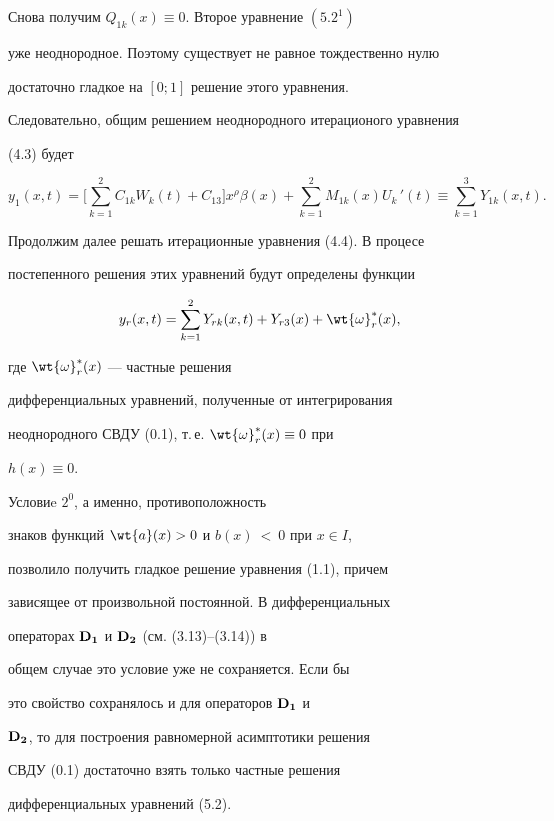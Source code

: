 Снова получим $Q_{1k} (x) \equiv 0$. Второе уравнение $(5.2^1)$


уже неоднородное. Поэтому существует не равное тождественно нулю


достаточно гладкое на $[0; 1]$ решение этого уравнения.


Следовательно, общим решением неоднородного итерационого уравнения


(4.3) будет


$$


y_1 (x, t) = \biggl[ \sum \limits_{k=1}^2 C_{1k} W_k (t) + C_{13}


\biggr] x^{\rho} \beta(x) + \sum \limits_{k=1}^2 M_{1k} (x)


U_k\, ' (t) \equiv \sum \limits_{k=1}^3 Y_{1k} (x, t).


$$





Продолжим далее решать итерационные уравнения (4.4). В процесе


постепенного решения этих уравнений будут определены функции


$$


y_r (x, t) = \sum _{k = 1}^2 Y_{rk} (x, t) + Y_{r3} (x) +\wt{\omega}_r^* (x),


$$


где $\wt{\o}_r^* (x)$ --- частные решения


дифференциальных уравнений, полученные от интегрирования


неоднородного СВДУ (0.1), т.\,е. $\wt{\o}_r^* (x)\equiv 0 $ при


$h(x)\equiv 0$.





\begin{note}


Условиe $2^0$, а именно, противоположность


знаков функций $\wt{a}(x)>0$ и $b(x)~<~0$ при $x \in I$,


позволило получить гладкое решение уравнения (1.1), причем


зависящее от произвольной постоянной. В дифференциальных


операторах $\bold{D_1}$ и $\bold{D_2}$ (см. (3.13)--(3.14)) в


общем случае это условие уже не сохраняется. Если бы


это свойство сохранялось и для операторов $\bold{D_1}$ и


$\bold{D_2}$, то для построения равномерной асимптотики решения


СВДУ (0.1) достаточно взять только частные решения


дифференциальных уравнений (5.2).


\end{note}





